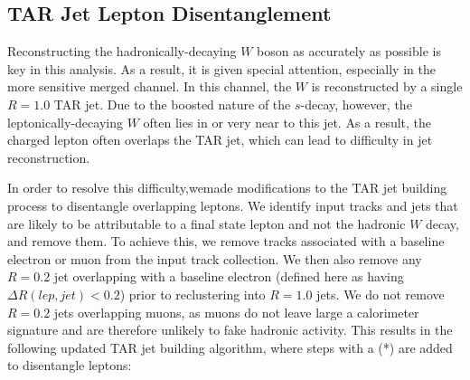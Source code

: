 \subsection{TAR Jet Lepton Disentanglement}
Reconstructing the hadronically-decaying $W$ boson as accurately as possible is key in this analysis. As a result, it is given special attention, especially in the more sensitive merged channel. In this channel, the $W$ is reconstructed by a single $R=1.0$ TAR jet. Due to the boosted nature of the $s$-decay, however, the leptonically-decaying $W$ often lies in or very near to this jet. As a result, the charged lepton often overlaps the TAR jet, which can lead to difficulty in jet reconstruction.

In order to resolve this difficulty,wemade modifications to the TAR jet building process to disentangle overlapping leptons. We identify input tracks and jets that are likely to be attributable to a final state lepton and not the hadronic $W$ decay, and remove them. To achieve this, we remove tracks associated with a baseline electron or muon from the input track collection. We then also remove any \akt $R=0.2$ jet overlapping with a baseline electron (defined here as having $\Delta R(lep,jet) < 0.2$) prior to reclustering into $R=1.0$ jets. We do not remove $R=0.2$ jets overlapping muons, as muons do not leave large a calorimeter signature and are therefore unlikely to fake hadronic activity. This results in the following updated TAR jet building algorithm, where steps with a (*) are added to disentangle leptons:

